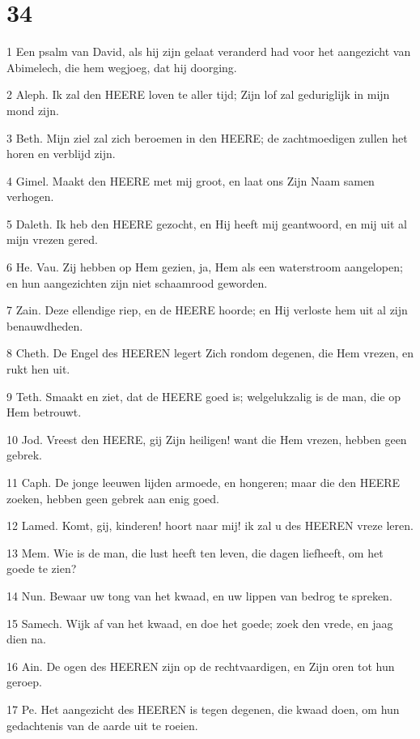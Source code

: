 \chapter{34}

\par 1 Een psalm van David, als hij zijn gelaat veranderd had voor het aangezicht van Abimelech, die hem wegjoeg, dat hij doorging.
\par 2 Aleph. Ik zal den HEERE loven te aller tijd; Zijn lof zal geduriglijk in mijn mond zijn.
\par 3 Beth. Mijn ziel zal zich beroemen in den HEERE; de zachtmoedigen zullen het horen en verblijd zijn.
\par 4 Gimel. Maakt den HEERE met mij groot, en laat ons Zijn Naam samen verhogen.
\par 5 Daleth. Ik heb den HEERE gezocht, en Hij heeft mij geantwoord, en mij uit al mijn vrezen gered.
\par 6 He. Vau. Zij hebben op Hem gezien, ja, Hem als een waterstroom aangelopen; en hun aangezichten zijn niet schaamrood geworden.
\par 7 Zain. Deze ellendige riep, en de HEERE hoorde; en Hij verloste hem uit al zijn benauwdheden.
\par 8 Cheth. De Engel des HEEREN legert Zich rondom degenen, die Hem vrezen, en rukt hen uit.
\par 9 Teth. Smaakt en ziet, dat de HEERE goed is; welgelukzalig is de man, die op Hem betrouwt.
\par 10 Jod. Vreest den HEERE, gij Zijn heiligen! want die Hem vrezen, hebben geen gebrek.
\par 11 Caph. De jonge leeuwen lijden armoede, en hongeren; maar die den HEERE zoeken, hebben geen gebrek aan enig goed.
\par 12 Lamed. Komt, gij, kinderen! hoort naar mij! ik zal u des HEEREN vreze leren.
\par 13 Mem. Wie is de man, die lust heeft ten leven, die dagen liefheeft, om het goede te zien?
\par 14 Nun. Bewaar uw tong van het kwaad, en uw lippen van bedrog te spreken.
\par 15 Samech. Wijk af van het kwaad, en doe het goede; zoek den vrede, en jaag dien na.
\par 16 Ain. De ogen des HEEREN zijn op de rechtvaardigen, en Zijn oren tot hun geroep.
\par 17 Pe. Het aangezicht des HEEREN is tegen degenen, die kwaad doen, om hun gedachtenis van de aarde uit te roeien.
